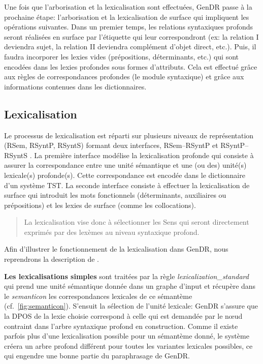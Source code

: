 Une fois que l'arborisation et la lexicalisation sont effectuées, GenDR passe à la prochaine étape: l'arborisation et la lexicalisation de surface qui impliquent les opérations suivantes. Dans un premier temps, les relations syntaxiques profonds seront réalisées en surface par l'étiquette qui leur correspondront (ex: la relation I deviendra sujet, la relation II deviendra complément d'objet direct, etc.). Puis, il faudra incorporer les lexies vides (prépositions, déterminants, etc.) qui sont encodées dans les lexies profondes sous formes d'attributs. Cela est effectué grâce aux règles de correspondances profondes (le module syntaxique) et grâce aux informations contenues dans les dictionnaires.


\subsection{Lexicalisation}\label{sec:lexicalisation}

Le processus de lexicalisation est réparti sur plusieurs niveaux de représentation (\ac{RSem}, \ac{RSyntP}, \ac{RSyntS}) formant deux interfaces, \ac{RSem}--\ac{RSyntP} et \ac{RSyntP}--\ac{RSyntS} \citep{PolguerePourmodelestratifie,lareau18}. La première interface modélise la lexicalisation profonde qui consiste à assurer la correspondance entre une unité sémantique et une (ou des) unité(s) lexicale(s) profonde(s). Cette correspondance est encodée dans le dictionnaire d'un système \ac{TST}. La seconde interface consiste à effectuer la lexicalisation de surface qui introduit les mots fonctionnels (déterminants, auxiliaires ou prépositions) et les lexies de surface (comme les collocations).

\begin{quote}
La lexicalisation vise donc à sélectionner les Sens qui seront directement exprimés par des lexèmes au niveau syntaxique profond.
\end{quote}
\vspace{-\baselineskip}
\hfill
\cite[p.~154]{PolguereStructurationmisejeu1990}

Afin d'illustrer le fonctionnement de la lexicalisation dans GenDR, nous reprendrons la description de \cite{lareau18}.

\textbf{Les lexicalisations simples}
sont traitées par la règle \emph{lexicalization\_standard} qui prend une unité sémantique donnée dans un graphe d'input et récupère dans le \emph{semanticon} les correspondances lexicales de ce sémantème (cf.~\ref{fig:semanticon}). S'ensuit la sélection de l'unité lexicale: GenDR s'assure que la \ac{DPOS} de la lexie choisie correspond à celle qui est demandée par le n\oe{}ud contraint dans l'arbre syntaxique profond en construction. Comme il existe parfois plus d'une lexicalisation possible pour un sémantème donné, le système créera un arbre profond différent pour toutes les variantes lexicales possibles, ce qui engendre une bonne partie du paraphrasage de GenDR.

